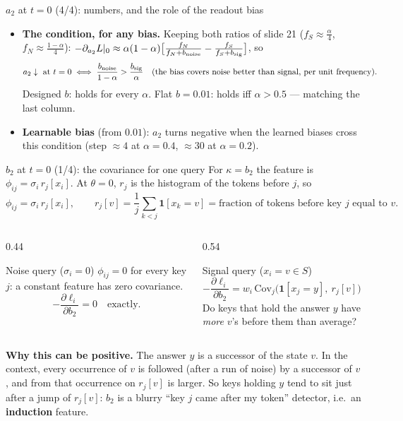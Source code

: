 \documentclass[aspectratio=169,11pt]{beamer}
\newcommand{\1}{\mathbf{1}}
\begin{document}
\begin{frame}{$a_2$ at $t=0$ (4/4): numbers, and the role of the readout bias}
\begin{itemize}
\item \textbf{The condition, for any bias.} Keeping both ratios of slide 21 ($f_S\approx\frac\alpha4$, $f_N\approx\frac{1-\alpha}4$):
$-\partial_{a_2}L|_0\approx\alpha(1-\alpha)\big[\frac{f_N}{f_N+b_{\rm noise}}-\frac{f_S}{f_S+b_{\rm sig}}\big]$, so
\[
a_2\downarrow\ \text{at }t=0\iff\frac{b_{\rm noise}}{1-\alpha}>\frac{b_{\rm sig}}{\alpha}
\quad\text{(the bias covers noise better than signal, per unit frequency).}
\]
Designed $b$: holds for every $\alpha$. Flat $b=0.01$: holds iff $\alpha>0.5$ --- matching the last column.
\item \textbf{Learnable bias} (from $0.01$): $a_2$ turns negative when the learned biases cross this condition
(step $\approx4$ at $\alpha=0.4$, $\approx30$ at $\alpha=0.2$).
\end{itemize}
\end{frame}

\begin{frame}{$b_2$ at $t=0$ (1/4): the covariance for one query}
\small
For $\kappa=b_2$ the feature is $\phi_{ij}=\sigma_i\,r_j[x_i]$. At $\theta=0$, $r_j$ is the histogram of the tokens before $j$, so
\[
\phi_{ij}=\sigma_i\,r_j[x_i],\qquad r_j[v]=\frac1j\sum_{k<j}\1[x_k=v]=\text{fraction of tokens before key $j$ equal to $v$.}
\]
\begin{columns}[T]
\begin{column}{0.44\textwidth}
\begin{block}{Noise query ($\sigma_i=0$)}
$\phi_{ij}=0$ for every key $j$: a constant feature has zero covariance.
\[
-\frac{\partial\ell_i}{\partial b_2}=0\quad\text{exactly.}
\]
\end{block}
\end{column}
\begin{column}{0.54\textwidth}
\begin{block}{Signal query ($x_i=v\in S$)}
\[
-\frac{\partial\ell_i}{\partial b_2}=w_i\,\mathrm{Cov}_j\big(\1[x_j=y],\ r_j[v]\big)
\]
Do keys that hold the answer $y$ have \emph{more} $v$'s before them than average?
\end{block}
\end{column}
\end{columns}
\vspace{0.4em}
\textbf{Why this can be positive.} The answer $y$ is a successor of the state $v$. In the context, every occurrence of $v$ is
followed (after a run of noise) by a successor of $v$, and from that occurrence on $r_j[v]$ is larger. So keys holding $y$ tend to sit
just after a jump of $r_j[v]$: $b_2$ is a blurry ``key $j$ came after my token'' detector, i.e.\ an \textbf{induction} feature.
\end{frame}
\end{document}
